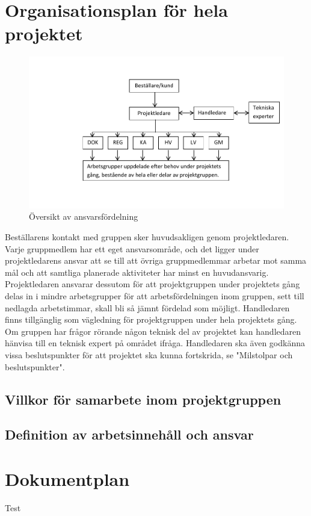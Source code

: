 \documentclass[a4paper,12pt]{article}
\begin{document}
\section{Organisationsplan för hela projektet}	%
\begin{figure}[h]
        \includegraphics{organisation-figur.pdf}
	\caption{Översikt av ansvarsfördelning}
\end{figure}
Beställarens kontakt med gruppen sker huvudsakligen genom projektledaren. Varje gruppmedlem har ett eget ansvarsområde, och det ligger under projektledarens ansvar att se till att övriga gruppmedlemmar arbetar mot samma mål och att samtliga planerade aktiviteter har minst en huvudansvarig. Projektledaren ansvarar dessutom för att projektgruppen under projektets gång  delas in i mindre arbetsgrupper för att arbetsfördelningen inom gruppen, sett till nedlagda arbetstimmar,  skall bli så jämnt fördelad som möjligt.
Handledaren finns tillgänglig som vägledning för projektgruppen under hela projektets gång. Om gruppen har frågor rörande någon teknisk del av projektet kan handledaren hänvisa till en teknisk expert på området ifråga. Handledaren ska även godkänna vissa beslutspunkter för att projektet ska kunna fortskrida, se "Milstolpar och beslutspunkter".
\subsection{Villkor för samarbete inom projektgruppen}
\subsection{Definition av arbetsinnehåll och ansvar}


\section{Dokumentplan}	%
Test
\end{document}
